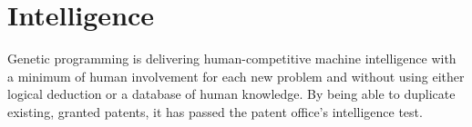 \documentclass[../main.tex]{subfiles}
\begin{document}
\section{Intelligence}
Genetic programming is delivering human-competitive machine intelligence with a minimum of human involvement for each
new problem and without using either logical deduction or a database of human knowledge. By being able to duplicate
existing, granted patents, it has passed the patent office's intelligence test.
\end{document}
